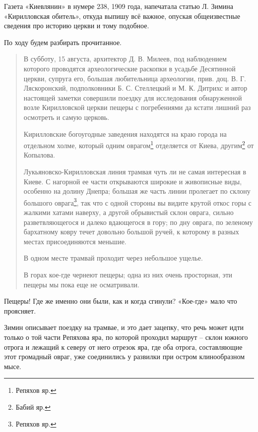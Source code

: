 
Газета «Киевлянин» в нумере 238, 1909 года, напечатала статью Л. Зимина «Кирилловская обитель», откуда выпишу всё важное, опуская общеизвестные сведения про историю церкви и тому подобное.

По ходу будем разбирать прочитанное.

\begin{quotation}
В субботу, 15 августа, архитектор Д. В. Милеев, под наблюдением которого проводятся археологические раскопки в усадьбе Десятинной церкви, супруга его, большая любительница археологии, прив. доц. В. Г. Ляскоронский, подполковники Б. С. Стеллецкий и М. К. Дитрихс и автор настоящей заметки совершили поездку для исследования обнаруженной возле Кирилловской церкви пещеры с погребениями да кстати лишний раз осмотреть и самую церковь.

Кирилловские богоугодные заведения находятся на краю города на отдельном холме, который одним оврагом\footnote{Репяхов яр.} отделяется от Киева, другим\footnote{Бабий яр.} от Копылова.

Лукьяновско-Кирилловская линия трамвая чуть ли не самая интересная в Киеве. С нагорной ее части открываются широкие и живописные виды, особенно на долину Днепра; большая же часть линии пролегает по склону большого оврага\footnote{Репяхов яр.}, так что с одной стороны вы видите крутой откос горы с жалкими хатами наверху, а другой обрывистый склон оврага, сильно разветвляющегося и далеко вдающегося в гору; по дну оврага, по зеленому бархатному ковру течет довольно большой ручей, к которому в разных местах присоединяются меньшие.

В одном месте трамвай проходит через небо\-льшое ущелье.

В горах кое-где чернеют пещеры; одна из них очень просторная, эти пещеры мы пока еще не осматривали.
\end{quotation} 

Пещеры! Где же именно они были, как и когда сгинули? «Кое-где» мало что проясняет.

Зимин описывает поездку на трамвае, и это дает зацепку, что речь может идти только о той части Репяхова яра, по которой проходил маршрут – склон южного отрога и лежащий к северу от него отрезок яра, где оба отрога, составляющие этот громадный овраг, уже соединились у развилки при остром клинообразном мысе.

